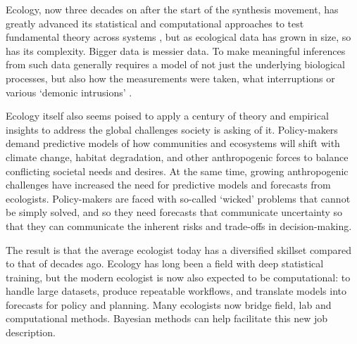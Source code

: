 \documentclass[11pt]{article}
\begin{document}
{Ecology, now three decades on after the start of the synthesis movement, has greatly advanced its statistical and computational approaches to test fundamental theory across systems \citep{Hampton2013}, but as ecological data has grown in size, so has its complexity. Bigger data is messier data. To make meaningful inferences from such data generally requires a model of not just the underlying biological processes, but also how the measurements were taken, what interruptions or various `demonic intrusions' \citep{Hurlbert:1984br}.  


Ecology itself also seems poised to apply a century of theory and empirical insights to address the global challenges society is asking of it. Policy-makers demand predictive models of how communities and ecosystems will shift with climate change, habitat degradation, and other anthropogenic forces to balance conflicting societal needs and desires. At the same time, growing anthropogenic challenges have increased the need for predictive models and forecasts from ecologists. Policy-makers are faced with so-called `wicked' problems that cannot be simply solved, and so they need forecasts that communicate uncertainty so that they can communicate the inherent risks and trade-offs in decision-making.

The result is that the average ecologist today has a diversified skillset compared to that of decades ago. Ecology has long been a field with deep statistical training, but the modern ecologist is now also expected to be computational: to handle large datasets, produce repeatable workflows, and translate models into forecasts for policy and planning. Many ecologists now bridge field, lab and computational methods. Bayesian methods can help facilitate this new job description. %

}
\end{document}
